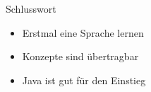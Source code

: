 \begin{frame}{Schlusswort}

    \begin{itemize}
        \item Erstmal eine Sprache lernen
        \item Konzepte sind übertragbar
        \item Java ist gut für den Einstieg
    \end{itemize}


\end{frame}